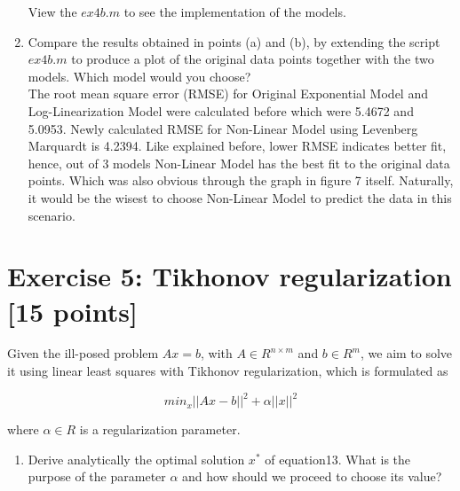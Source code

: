 \documentclass[unicode,11pt,a4paper,oneside,numbers=endperiod,openany]{scrartcl}
\newcommand{\norm}[1]{\lvert\lvert #1 \rvert\rvert}
\begin{document}
\begin{enumerate}[label=(\alph*)]
View the ${ex4b.m}$ to see the implementation of the models. \\

\newpage

\item Compare the results obtained in points (a) and (b), by extending the script ${ex4b.m}$ to produce a plot of the
original data points together with the two models. Which model would you choose? \\

The root mean square error (RMSE) for Original Exponential Model and Log-Linearization Model were calculated before which were 5.4672 and 5.0953. Newly calculated RMSE for Non-Linear Model using Levenberg Marquardt is 4.2394. Like explained before, lower RMSE indicates better fit, hence, out of 3 models Non-Linear Model has the best fit to the original data points. Which was also obvious through the graph in figure 7 itself. Naturally, it would be the wisest to choose Non-Linear Model to predict the data in this scenario.

\end{enumerate}


\section*{Exercise 5: Tikhonov regularization [15 points]}
Given the ill-posed problem ${Ax = b}$, with ${A \in R^{n\times m}}$ and ${b \in R^m}$, we aim to solve it using linear
least squares with Tikhonov regularization, which is formulated as

\begin{equation}
 min_x \norm{Ax - b}^2 + \alpha \norm{x}^2
\end{equation}

where ${\alpha \in R}$ is a regularization parameter.

\begin{enumerate}[label=(\alph*)]
 \item Derive analytically the optimal solution ${x^*}$ of equation13. What is the purpose of the parameter 
 ${\alpha}$ and how should
we proceed to choose its value?
\end{enumerate}
\end{document}

